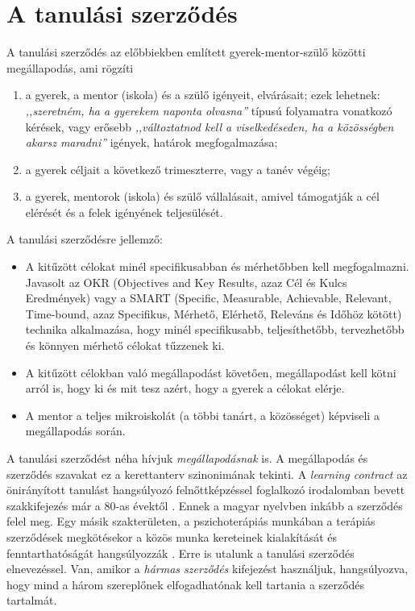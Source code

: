 \section{A tanulási szerződés}

A tanulási szerződés az előbbiekben említett gyerek-mentor-szülő közötti megállapodás, ami rögzíti
\begin{enumerate}
      \item a gyerek, a mentor (iskola) és a szülő igényeit, elvárásait;\hfill\break
 ezek lehetnek: \emph{,,szeretném, ha a gyerekem naponta olvasna''} típusú folyamatra vonatkozó kérések, vagy erősebb \emph{,,változtatnod       kell a viselkedéseden, ha a közösségben akarsz maradni''} igények, határok megfogalmazása;

      \item a gyerek céljait a következő trimeszterre, vagy a tanév végéig;

      \item a gyerek, mentorok (iskola) és szülő vállalásait, amivel támogatják a cél elérését és a felek igényének teljesülését.

\end{enumerate}

A tanulási szerződésre jellemző:
\begin{itemize}
      \item A kitűzött célokat minél specifikusabban és mérhetőbben kell megfogalmazni. Javasolt az OKR  (Objectives and Key Results, azaz	Cél és Kulcs Eredmények) \citep{okr} vagy a SMART (Specific, Measurable, Achievable, Relevant, Time-bound, azaz Specifikus,  Mérhető, Elérhető, Releváns és Időhöz kötött) \citep{wiki:smart} technika alkalmazása, hogy minél specifikusabb, teljesíthetőbb, tervezhetőbb és könnyen mérhető célokat tűzzenek ki.

      \item A kitűzött célokban való megállapodást követően, megállapodást kell kötni arról is, hogy ki és mit tesz azért, hogy a gyerek a célokat elérje.

      \item A mentor a teljes mikroiskolát (a többi tanárt, a közösséget) képviseli a megállapodás során.
\end{itemize}

A tanulási szerződést néha hívjuk \emph{megállapodásnak} is. A megállapodás és szerződés szavakat ez a kerettanterv szinonimának tekinti. A \emph{learn\-ing con\-tract} az önirányított tanulást hangsúlyozó felnőttképzéssel foglalkozó irodalomban bevett szakkifejezés már a 80-as évektől \citep{Malcolm77}. Ennek a magyar nyelvben inkább a szerződés felel meg. Egy másik szakterületen, a pszichoterápiás munkában a terápiás szerződések megkötésekor a közös munka kereteinek kialakítását és fenntarthatóságát hangsúlyozzák \citep{pszichoterapia}. Erre is utalunk a tanulási szerződés elnevezéssel. Van, amikor a \emph{hármas szerződés} kifejezést használjuk, hangsúlyozva, hogy mind a három szereplőnek elfogadhatónak kell tartania a szerződés tartalmát.
